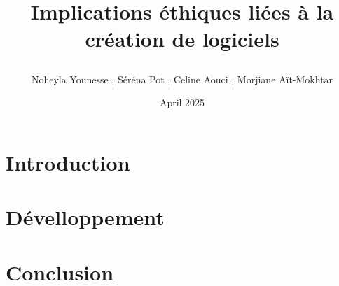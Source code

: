 \documentclass{article}
\title{Implications éthiques liées à la création de logiciels

}
\author{Noheyla Younesse , Séréna Pot , Celine Aouci , Morjiane Aït-Mokhtar}
\date{April 2025}
\begin{document}
\maketitle

\section{Introduction}

\section{Dévelloppement}

\section{Conclusion}
\end{document}
